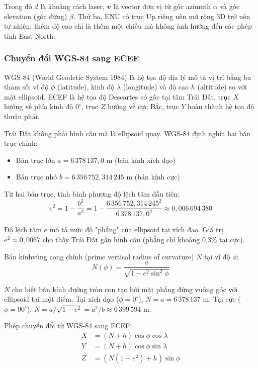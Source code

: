 Trong đó $d$ là khoảng cách laser, $\mathbf{v}$ là vector đơn vị từ góc azimuth $\alpha$ và góc elevation (góc đứng) $\beta$. Thứ ba, ENU có trục Up riêng nên mở rộng 3D trở nên tự nhiên; thêm độ cao chỉ là thêm một chiều mà không ảnh hưởng đến các phép tính East-North.

\subsubsection{Chuyển đổi WGS-84 sang ECEF}

\hspace{0.5cm} WGS-84 (World Geodetic System 1984) là hệ tọa độ địa lý mô tả vị trí bằng ba tham số: vĩ độ $\phi$ (latitude), kinh độ $\lambda$ (longitude) và độ cao $h$ (altitude) so với mặt ellipsoid. ECEF là hệ tọa độ Descartes có gốc tại tâm Trái Đất, trục $X$ hướng về phía kinh độ $0^\circ$, trục $Z$ hướng về cực Bắc, trục $Y$ hoàn thành hệ tọa độ thuận phải.

Trái Đất không phải hình cầu mà là ellipsoid quay. WGS-84 định nghĩa hai bán trục chính:
\begin{itemize}
    \item Bán trục lớn $a = 6\,378\,137{,}0$ m (bán kính xích đạo)
    \item Bán trục nhỏ $b = 6\,356\,752{,}314\,245$ m (bán kính cực)
\end{itemize}

Từ hai bán trục, tính bình phương độ lệch tâm đầu tiên:
\begin{equation}
    e^2 = 1 - \frac{b^2}{a^2} = 1 - \frac{6\,356\,752{,}314\,245^2}{6\,378\,137{,}0^2} \approx 0{,}006\,694\,380
\end{equation}

Độ lệch tâm $e$ mô tả mức độ "phẳng" của ellipsoid tại xích đạo. Giá trị $e^2 \approx 0{,}0067$ cho thấy Trái Đất gần hình cầu (phẳng chỉ khoảng 0,3\% tại cực).

Bán kínhvùng cong chính (prime vertical radius of curvature) $N$ tại vĩ độ $\phi$:
\begin{equation}
    N(\phi) = \frac{a}{\sqrt{1 - e^2 \sin^2\phi}}
\end{equation}

$N$ cho biết bán kính đường tròn con tạo bởi mặt phẳng đứng vuông góc với ellipsoid tại một điểm. Tại xích đạo ($\phi = 0^\circ$), $N = a = 6\,378\,137$ m. Tại cực ($\phi = 90^\circ$), $N = a / \sqrt{1 - e^2} = a^2/b \approx 6\,399\,594$ m.

Phép chuyển đổi từ WGS-84 sang ECEF:
\begin{equation}
\begin{aligned}
    X &= (N + h) \cos\phi \cos\lambda \\
    Y &= (N + h) \cos\phi \sin\lambda \\
    Z &= \left(N(1 - e^2) + h\right) \sin\phi
\end{aligned}
\end{equation}

